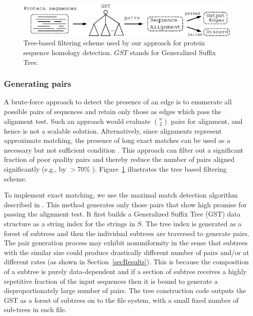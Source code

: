 \documentclass[10pt,journal,letterpaper,compsoc]{IEEEtran}
\begin{document}



\begin{figure}[tb]
\centerline{
						\includegraphics[angle=0, scale=0.60]{icppFram.eps}
            }
\caption{
Tree-based filtering scheme used by our approach for protein sequence homology detection. $GST$ stands for Generalized Suffix Tree.
}
\label{figFramework}
\end{figure}

\subsubsection{Generating pairs}
\label{secGeneratingPairs}

A brute-force approach to detect the presence of an edge is to enumerate all possible pairs of sequences and retain only those as edges which pass the alignment test. Such an approach would evaluate $n\choose 2$ pairs for alignment, and hence is not a scalable solution. Alternatively, since alignments represent approximate matching, the presence of long exact matches can be used as a necessary but not sufficient condition \cite{Kalyanaraman07}. This approach can filter out a significant fraction of poor quality pairs and thereby reduce the number of pairs aligned significantly (e.g., by $>70\%$ \cite{Wu08}).  Figure~\ref{figFramework} illustrates the tree based filtering scheme.

To implement exact matching, we use the maximal match detection algorithm described in \cite{Kalyanaraman07}. This method generates only those pairs that show high promise for passing the alignment test. It first builds a Generalized Suffix Tree (GST) data structure \cite{Weiner73} as a string index for the strings in $S$. The tree index is generated as a forest of subtrees and then the individual subtrees are traversed to generate pairs. The pair generation process may exhibit nonuniformity in the sense that subtrees with the similar size could produce drastically different number of pairs and/or at different rates (as shown in Section~\ref{secResults}). This is because the composition of a subtree is purely data-dependent and if a section of subtree receives a highly repetitive fraction of the input sequences then it is bound to generate a disproportionately large number of pairs. The tree construction code outputs the GST as a forest of subtrees on to the file system, with a small fixed number of sub-trees in each file.
\end{document}
